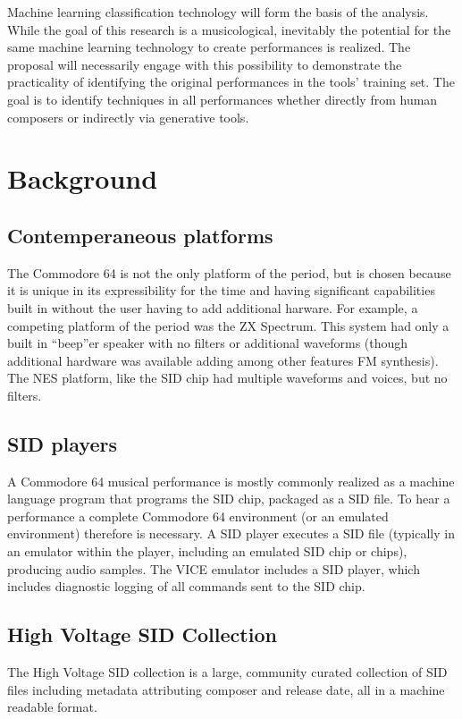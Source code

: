 \documentclass[10pt]{article}
\begin{document}
\begin{multicols*}{2}
  Machine learning classification technology will form the basis of
  the analysis. While the goal of this research is a musicological,
  inevitably the potential for the same machine learning technology to
  create performances is realized. The proposal will necessarily
  engage with this possibility to demonstrate the practicality of
  identifying the original performances in the tools' training
  set. The goal is to identify techniques in all performances whether
  directly from human composers or indirectly via generative tools.

  \section{Background}

  \subsection{Contemperaneous platforms}
  The Commodore 64 is not the only platform of the period, but is
  chosen because it is unique in its expressibility for the time and
  having significant capabilities built in without the user having to
  add additional harware. For example, a competing platform of the
  period was the ZX Spectrum. This system had only a built in
  ``beep''er speaker with no filters or additional waveforms (though
  additional hardware was available adding among other features
  FM synthesis). The NES platform, like the SID chip had multiple
  waveforms and voices, but no filters.

  \subsection{SID players}
  A Commodore 64 musical performance is mostly commonly realized as a
  machine language program that programs the SID chip, packaged as a
  SID file. To hear a performance a complete Commodore 64 environment
  (or an emulated environment) therefore is necessary. A SID player
  executes a SID file (typically in an emulator within the player,
  including an emulated SID chip or chips), producing audio samples.
  The VICE emulator includes a SID player, which includes diagnostic
  logging of all commands sent to the SID chip.

  \subsection{High Voltage SID Collection}
  The High Voltage SID collection is a large, community curated
  collection of SID files including metadata attributing composer
  and release date, all in a machine readable format.


\end{multicols*}
\end{document}
